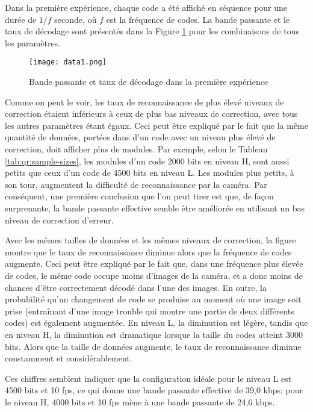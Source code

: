 Dans la première expérience, chaque code a été affiché en séquence pour une durée de $1/f$ seconde, où $f$ est la fréquence de codes. La bande passante et le taux de décodage sont présentés dans la Figure \ref{img-exp1} pour les combinaisons de tous les paramètres.

\begin{figure}
\begin{center}
\centering
\texttt{[image: data1.png]}
\caption{Bande passante et taux de décodage dans la première expérience}
\label{img-exp1}
\end{center}
\end{figure}

Comme on peut le voir, les taux de reconnaissance de plus élevé niveaux de correction étaient inférieurs à ceux de plus bas niveaux de correction, avec tous les autres paramètres étant égaux. Ceci peut être expliqué par le fait que la même quantité de données, portées dans d'un code avec un niveau plus élevé de correction, doit afficher plus de modules. Par exemple, selon le Tableau \ref{tab:qr:sample-sizes}, les modules d'un code 2000 bits en niveau H, sont aussi petits que ceux d'un code de 4500 bits en niveau L. Les modules plus petits, à son tour, augmentent la difficulté de reconnaissance par la caméra. Par conséquent, une première conclusion que l'on peut tirer est que, de façon surprenante, la bande passante effective semble être améliorée en utilisant un bas niveau de correction d'erreur.

Avec les mêmes tailles de données et les mêmes niveaux de correction, la figure montre que le taux de reconnaissance diminue alors que la fréquence de codes augmente. Ceci peut être expliqué par le fait que, dans une fréquence plus élevée de codes, le même code occupe moins d'images de la caméra, et a donc moins de chances d'être correctement décodé dans l'une des images. En outre, la probabilité qu'un changement de code se produise au moment où une image soit prise (entraînant d'une image trouble qui montre une partie de deux différents codes) est également augmentée. En niveau L, la diminution est légère, tandis que en niveau H, la diminution est dramatique lorsque la taille du codes atteint 3000 bits. Alors que la taille de données augmente, le taux de reconnaissance diminue constamment et considérablement.

Ces chiffres semblent indiquer que la configuration idéale pour le niveau L est 4500 bits et 10 fps, ce qui donne une bande passante effective de 39,0 kbps; pour le niveau H, 4000 bits et 10 fps mène à une bande passante de 24,6 kbps.

